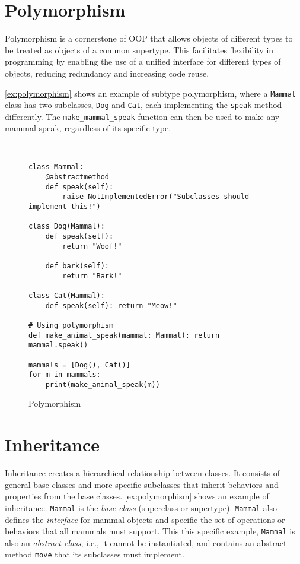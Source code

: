 \documentclass[oneside,11pt,dvipsnames]{book}
\newcommand{\code}[1]{\texttt{#1}}
\begin{document}
\section{Polymorphism}

Polymorphism is a cornerstone of OOP that allows objects of different types to be treated as objects of a common supertype. This facilitates flexibility in programming by enabling the use of a unified interface for different types of objects, reducing redundancy and increasing code reuse.

\autoref{ex:polymorphism} shows an example of subtype polymorphism, where a \code{Mammal} class has two subclasses, \code{Dog} and \code{Cat}, each implementing the \code{speak} method differently. The \code{make\_mammal\_speak} function can then be used to make any mammal speak, regardless of its specific type.

\begin{figure}
\begin{lstlisting}


class Mammal:
    @abstractmethod
    def speak(self):
        raise NotImplementedError("Subclasses should implement this!")

class Dog(Mammal):
    def speak(self):
        return "Woof!"

    def bark(self):
        return "Bark!"

class Cat(Mammal):
    def speak(self): return "Meow!"
        
# Using polymorphism
def make_animal_speak(mammal: Mammal): return mammal.speak()

mammals = [Dog(), Cat()]
for m in mammals:
    print(make_animal_speak(m))
\end{lstlisting}
\caption{Polymorphism}\label{ex:polymorphism}
\end{figure}

\section{Inheritance}

Inheritance creates a hierarchical relationship between classes. It consists of general base classes and more specific subclasses that inherit behaviors and properties from the base classes. \autoref{ex:polymorphism} shows an example of inheritance. \code{Mammal} is the \emph{base class} (superclass or supertype). \code{Mammal} also defines the \emph{interface} for mammal objects and specific the set of operations or behaviors that all mammals must support. This this specific example, \code{Mammal} is also an \emph{abstract class}, i.e., it cannot be instantiated, and contains an abstract method \code{move} that its subclasses must implement.
\end{document}
